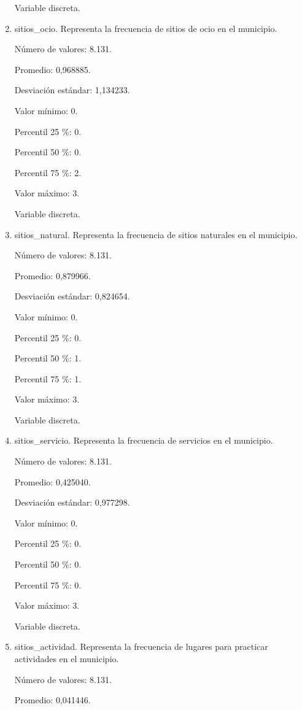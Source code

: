 \begin{enumerate}
	Variable discreta.

	\item sitios\_ocio. Representa la frecuencia de sitios de ocio en el municipio.
	
	Número de valores: 8.131.
	
	Promedio: 0,968885.
	
	Desviación estándar: 1,134233.
	
	Valor mínimo: 0.
	
	Percentil 25 \%: 0.
	
	Percentil 50 \%: 0.
	
	Percentil 75 \%: 2.
	
	Valor máximo: 3.
	
	Variable discreta.

	\item sitios\_natural. Representa la frecuencia de sitios naturales en el municipio.
	
	Número de valores: 8.131.
	
	Promedio: 0,879966.
	
	Desviación estándar: 0,824654.
	
	Valor mínimo: 0.
	
	Percentil 25 \%: 0.
	
	Percentil 50 \%: 1.
	
	Percentil 75 \%: 1.
	
	Valor máximo: 3.
	
	Variable discreta.

	\item sitios\_servicio. Representa la frecuencia de servicios en el municipio.
	
	Número de valores: 8.131.
	
	Promedio: 0,425040.
	
	Desviación estándar: 0,977298.
	
	Valor mínimo: 0.
	
	Percentil 25 \%: 0.
	
	Percentil 50 \%: 0.
	
	Percentil 75 \%: 0.
	
	Valor máximo: 3.
	
	Variable discreta.

	\item sitios\_actividad. Representa la frecuencia de lugares para practicar actividades en el municipio.
	
	Número de valores: 8.131.
	
	Promedio: 0,041446.
	

\end{enumerate}
